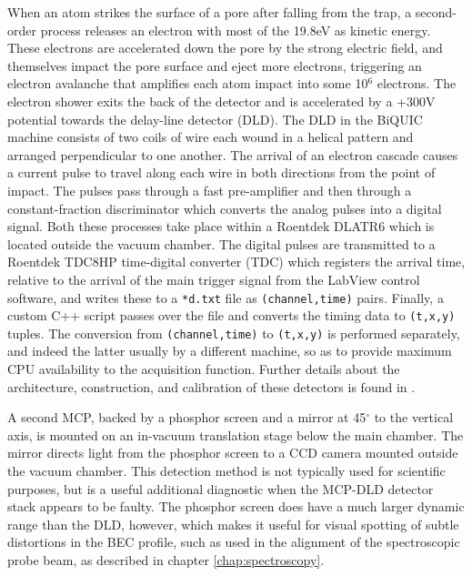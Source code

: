	When an atom strikes the surface of a pore after falling from the trap, a second-order process releases an electron with most of the  19.8eV as kinetic energy\cite{ThatPaper}. These electrons are accelerated down the pore by the strong electric field, and themselves impact the pore surface and eject more electrons, triggering an electron avalanche that amplifies each atom impact into some 10$^6$ electrons. The electron shower exits the back of the detector and is accelerated by a +300V potential towards the delay-line detector (DLD). The DLD in the BiQUIC machine consists of two coils of wire each wound in a helical pattern and arranged perpendicular to one another.  The arrival of an electron cascade causes a current pulse to travel along each wire in both directions from the point of impact. The pulses pass through a fast pre-amplifier and then through a constant-fraction discriminator which converts the analog pulses into a digital signal. Both these processes take place within a Roentdek DLATR6 which is located outside the vacuum chamber. The digital pulses are transmitted to a Roentdek TDC8HP time-digital converter (TDC) which registers the arrival time, relative to the arrival of the main trigger signal from the LabView control software, and writes these to a \verb|*d.txt| file as \verb|(channel,time)| pairs. Finally, a custom C++ script passes over the file and converts the timing data to \verb|(t,x,y)| tuples. The conversion from \verb|(channel,time)| to \verb|(t,x,y)| is performed separately, and indeed the latter usually by a different machine, so as to provide maximum CPU availability to the acquisition function.	Further details about the architecture, construction, and calibration of these detectors is found in \cite{HodgmanThesis,ManningThesis}.

	A second MCP, backed by a phosphor screen and a mirror at 45$^\circ$ to the vertical axis, is mounted on an in-vacuum translation stage below the main chamber. The mirror directs light from the phosphor screen to a CCD camera mounted outside the vacuum chamber. This detection method is not typically used for scientific purposes, but is a useful additional diagnostic when the MCP-DLD detector stack appears to be faulty. The phosphor screen does have a much larger dynamic range than the DLD, however, which makes it useful for visual spotting of subtle distortions in the BEC profile, such as used in the alignment of the spectroscopic probe beam, as described in chapter \ref{chap:spectroscopy}. 


